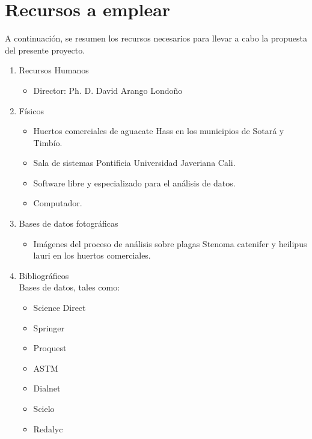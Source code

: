 \section{Recursos a emplear}
A continuación, se resumen los recursos necesarios para llevar a cabo la propuesta del presente proyecto.
\begin{enumerate}
    \item Recursos Humanos
    \begin{itemize}
        \item Director: Ph. D. David Arango Londoño
    \end{itemize}
    \item Físicos
    \begin{itemize}
        \item Huertos comerciales de aguacate Hass en los municipios de Sotará y Timbío.
        \item Sala de sistemas Pontificia Universidad Javeriana Cali.
        \item Software libre y especializado para el análisis de datos.
        \item Computador.
    \end{itemize}
    \item Bases de datos fotográficas
    \begin{itemize}
        \item Imágenes del proceso de análisis sobre plagas Stenoma catenifer y heilipus lauri en los huertos comerciales.
    \end{itemize}
    \item Bibliográficos \\
    Bases de datos, tales como:
    \begin{itemize}
        \item Science Direct
        \item Springer
        \item Proquest
        \item ASTM
        \item Dialnet
        \item Scielo 
        \item Redalyc 
    \end{itemize}
\end{enumerate}
